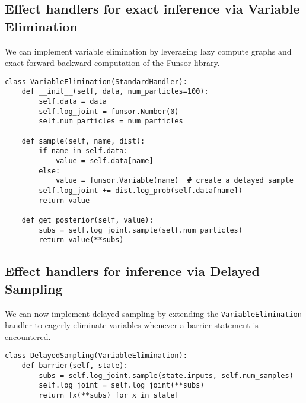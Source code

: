 \documentclass[anonymous=false, %
               format=acmsmall, %
               review=true, %
               screen=true, %
               nonacm=true]{acmart}
\begin{document}
\subsection{Effect handlers for exact inference via Variable Elimination}
We can implement variable elimination by leveraging lazy compute graphs and exact forward-backward computation of the Funsor library.
\label{sec:appendix:exact}
\begin{verbatim}
class VariableElimination(StandardHandler):
    def __init__(self, data, num_particles=100):
        self.data = data
        self.log_joint = funsor.Number(0)
        self.num_particles = num_particles

    def sample(self, name, dist):
        if name in self.data:
            value = self.data[name]
        else:
            value = funsor.Variable(name)  # create a delayed sample
        self.log_joint += dist.log_prob(self.data[name])
        return value

    def get_posterior(self, value):
        subs = self.log_joint.sample(self.num_particles)
        return value(**subs)
\end{verbatim}

\subsection{Effect handlers for inference via Delayed Sampling}
We can now implement delayed sampling by extending the \verb$VariableElimination$ handler to eagerly eliminate variables whenever a barrier statement is encountered.
\label{sec:appendix:delayed}
\begin{verbatim}
class DelayedSampling(VariableElimination):
    def barrier(self, state):
        subs = self.log_joint.sample(state.inputs, self.num_samples)
        self.log_joint = self.log_joint(**subs)
        return [x(**subs) for x in state]
\end{verbatim}
\end{document}

